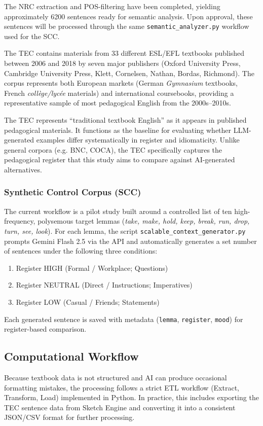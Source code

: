 The NRC extraction and POS-filtering have been completed, yielding approximately 6200 sentences ready for semantic analysis. Upon approval, these sentences will be processed through the same \texttt{semantic\_analyzer.py} workflow used for the SCC.

The TEC contains materials from 33 different ESL/EFL textbooks published between 2006 and 2018 by seven major publishers (Oxford University Press, Cambridge University Press, Klett, Cornelsen, Nathan, Bordas, Richmond). The corpus represents both European markets (German \textit{Gymnasium} textbooks, French \textit{coll\`ege/lyc\'ee} materials) and international coursebooks, providing a representative sample of most pedagogical English from the 2000s--2010s.

The TEC represents ``traditional textbook English'' as it appears in published pedagogical materials. It functions as the baseline for evaluating whether LLM-generated examples differ systematically in register and idiomaticity. Unlike general corpora (e.g. BNC, COCA), the TEC specifically captures the pedagogical register that this study aims to compare against AI-generated alternatives.

\subsubsection{Synthetic Control Corpus (SCC)}

The current workflow is a pilot study built around a controlled list of ten high-frequency, polysemous target lemmas (\textit{take, make, hold, keep, break, run, drop, turn, see, look}). For each lemma, the script \texttt{scalable\_context\_generator.py} prompts Gemini Flash 2.5 via the API and automatically generates a set number of sentences under the following three conditions:

\begin{enumerate}
    \item {Register HIGH (Formal / Workplace; Questions)}
    \item {Register NEUTRAL (Direct / Instructions; Imperatives)}
    \item {Register LOW (Casual / Friends; Statements)}
\end{enumerate}

Each generated sentence is saved with metadata (\texttt{lemma}, \texttt{register}, \texttt{mood}) for register-based comparison.

\subsection{Computational Workflow}
Because textbook data is not structured and AI can produce occasional formatting mistakes, the processing follows a strict ETL workflow (Extract, Transform, Load) implemented in Python. In practice, this includes exporting the TEC sentence data from Sketch Engine and converting it into a consistent JSON/CSV format for further processing.

